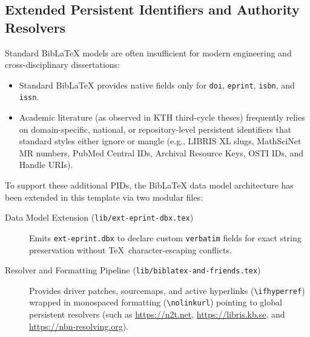 \documentclass[12pt, twoside]{article}
\begin{document}
\subsection{Extended Persistent Identifiers and Authority Resolvers}
\label{sec:cycle3ExtendedBiblatex}
Standard BibLaTeX models are often insufficient for modern engineering and cross-disciplinary dissertations:
\begin{itemize}
    \item Standard BibLaTeX provides native fields only for \texttt{doi}, \texttt{eprint}, \texttt{isbn}, and \texttt{issn}.

    \item Academic literature (as observed in KTH third-cycle theses) frequently relies on domain-specific, national, or repository-level persistent identifiers that standard styles either ignore or mangle (e.g., LIBRIS XL slugs, MathSciNet MR numbers, PubMed Central IDs, Archival Resource Keys, OSTI IDs, and Handle URIs).
\end{itemize}

To support these additional \glspl{PID}, the BibLaTeX data model architecture has been extended in this template via two modular files:
\begin{description}
    \item[Data Model Extension (\texttt{lib/ext-eprint-dbx.tex})] Emits \texttt{ext-eprint.dbx} to declare custom \texttt{verbatim} fields for exact string preservation without \TeX\ character-escaping conflicts.
    \item[Resolver and Formatting Pipeline (\texttt{lib/biblatex-and-friends.tex})] Provides driver patches, sourcemaps, and active hyperlinks (\texttt{\textbackslash ifhyperref}) wrapped in monospaced formatting (\texttt{\textbackslash nolinkurl}) pointing to global persistent resolvers (such as \url{https://n2t.net}, \url{https://libris.kb.se}, and \url{https://nbn-resolving.org}).
\end{description}
\end{document}
